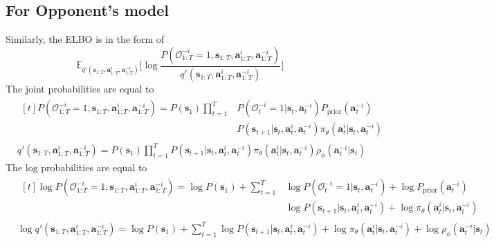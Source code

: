 \subsection{For Opponent's model}
Similarly, the ELBO is in the form of 
\begin{equation}
    \mathbb{E}_{q'(\boldsymbol{s}_{1:T}, \boldsymbol{a}^i_{1:T}, \boldsymbol{a}^{-i}_{1:T})}\Bigg[ \log \frac{P(\mathcal{O}^{-i}_{1:T} = 1, \boldsymbol{s}_{1:T}, \boldsymbol{a}^i_{1:T}, \boldsymbol{a}^{-i}_{1:T})}{q'(\boldsymbol{s}_{1:T}, \boldsymbol{a}^i_{1:T}, \boldsymbol{a}^{-i}_{1:T})} \Bigg]    
\end{equation}
The joint probabilities are equal to 
\begin{equation}
    \begin{aligned}
        &\begin{aligned}[t]
            P(\mathcal{O}^{-i}_{1:T} = 1, \boldsymbol{s}_{1:T}, \boldsymbol{a}^i_{1:T}, \boldsymbol{a}^{-i}_{1:T}) = P(\boldsymbol{s}_1) \prod^T_{t=1} &P(\mathcal{O}^{-i}_{t} = 1 | \boldsymbol{s}_{t}, \boldsymbol{a}^{-i}_{t}) P_{\text{prior}}(\boldsymbol{a}^{-i}_t) \\
            &P(\boldsymbol{s}_{t+1} | \boldsymbol{s}_{t}, \boldsymbol{a}^i_{t}, \boldsymbol{a}^{-i}_{t}) \pi_{\theta}(\boldsymbol{a}^{i}_t | \boldsymbol{s}_t, \boldsymbol{a}^{-i}_t)
        \end{aligned}\\
        &q'(\boldsymbol{s}_{1:T}, \boldsymbol{a}^i_{1:T}, \boldsymbol{a}^{-i}_{1:T}) = P(\boldsymbol{s}_1) \prod^T_{t=1} P(\boldsymbol{s}_{t+1} | \boldsymbol{s}_{t}, \boldsymbol{a}^i_{t}, \boldsymbol{a}^{-i}_{t}) \pi_{\theta}(\boldsymbol{a}^i_t | \boldsymbol{s}_t, \boldsymbol{a}^{-i}_t) \rho_{\phi}(\boldsymbol{a}^{-i}_t | \boldsymbol{s}_t)
    \end{aligned}
\end{equation}
The log probabilities are equal to 
\begin{equation}
    \begin{aligned}
        &\begin{aligned}[t]
            \log P(\mathcal{O}^{-i}_{1:T} = 1, \boldsymbol{s}_{1:T}, \boldsymbol{a}^i_{1:T}, \boldsymbol{a}^{-i}_{1:T}) = \log P(\boldsymbol{s}_1) + \sum^T_{t=1} &\log P(\mathcal{O}^{-i}_{t} = 1 | \boldsymbol{s}_{t}, \boldsymbol{a}^{-i}_{t}) + \log P_{\text{prior}}(\boldsymbol{a}^{-i}_t) \\
            &\log P(\boldsymbol{s}_{t+1} | \boldsymbol{s}_{t}, \boldsymbol{a}^i_{t}, \boldsymbol{a}^{-i}_{t}) +  \log \pi_{\theta}(\boldsymbol{a}^{i}_t | \boldsymbol{s}_t, \boldsymbol{a}^{-i}_t)
        \end{aligned}\\
        &\log q'(\boldsymbol{s}_{1:T}, \boldsymbol{a}^i_{1:T}, \boldsymbol{a}^{-i}_{1:T}) = \log P(\boldsymbol{s}_1) + \sum^T_{t=1} \log P(\boldsymbol{s}_{t+1} | \boldsymbol{s}_{t}, \boldsymbol{a}^i_{t}, \boldsymbol{a}^{-i}_{t}) + \log \pi_{\theta}(\boldsymbol{a}^i_t | \boldsymbol{s}_t, \boldsymbol{a}^{-i}_t) + \log \rho_{\phi}(\boldsymbol{a}^{-i}_t | \boldsymbol{s}_t)
    \end{aligned}
\end{equation}
